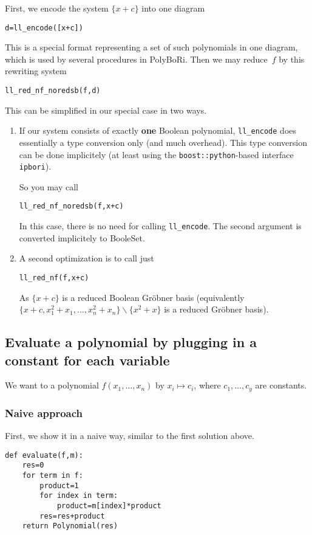 \documentclass[]{article}
\newcommand{\PolyBoRi}{{\sc PolyBoRi}\xspace}
\newcommand{\explfieldequations}{{x_1^2+x_1,\ldots,x_n^2+x_n}}
\begin{document}
First, we encode the system $\{x+c\}$ into one diagram
\begin{verbatim}
d=ll_encode([x+c])    
\end{verbatim}
%
This is a special format representing a set of such polynomials in one diagram, which is used by several procedures in
\PolyBoRi.
Then we may
reduce~$f$ by this rewriting system
\begin{verbatim}
ll_red_nf_noredsb(f,d)  
\end{verbatim}
%
%
This can be simplified in our special case in two ways.
\begin{enumerate}
    \item If our system consists of exactly \textbf{one} Boolean polynomial,
    \verb|ll_encode| does essentially  a type conversion only (and much overhead).
    This type conversion can be done implicitely (at least using the
\verb|boost::python|-based  interface \verb|ipbori|).

    So you may call
\begin{verbatim}
ll_red_nf_noredsb(f,x+c)  
\end{verbatim}
%
    In this case, there is no need for calling \verb|ll_encode|.
    The second argument is converted implicitely to BooleSet.
    \item A second optimization is to call just
\begin{verbatim}
ll_red_nf(f,x+c)
\end{verbatim}
    As $\{x+c\}$ is a reduced Boolean Gröbner basis (equivalently $\{x+c,\explfieldequations\}\backslash \{x^2+x\}$ is a reduced Gröbner basis).
\end{enumerate}



\subsection{Evaluate a polynomial by plugging in a constant for each variable}
    We want to a polynomial
    $f(x_1,\ldots, x_n)$
    by
    $x_i\mapsto c_i$, where
    $c_1,\ldots, c_y$ are constants.
\subsubsection{Naive approach}
First, we show it in a naive way, similar to the first solution above.

\begin{verbatim}
def evaluate(f,m):
    res=0
    for term in f:
        product=1
        for index in term:
            product=m[index]*product
        res=res+product
    return Polynomial(res)
\end{verbatim}
\end{document}
